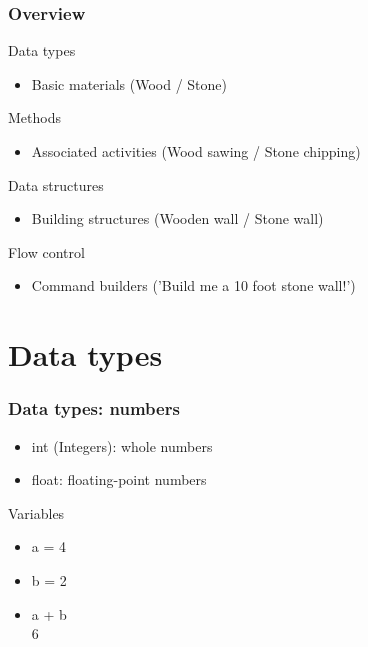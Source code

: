 \documentclass[]{beamer}
\begin{document}
\begin{frame}
\frametitle{Overview}

\begin{block}{Data types}
\begin{itemize}
\item Basic materials (Wood / Stone)  
\end{itemize}
\end{block}

\pause

\begin{block}{Methods}
\begin{itemize}
\item Associated activities (Wood sawing / Stone chipping)
\end{itemize}
\end{block}

\pause

\begin{block}{Data structures}
\begin{itemize}
\item Building structures (Wooden wall / Stone wall)  
\end{itemize}
\end{block}

\pause

\begin{block}{Flow control}
\begin{itemize}
\item Command builders ('Build me a 10 foot stone wall!')
\end{itemize}
\end{block}

\end{frame}


\section{Data types}

\begin{frame}
\frametitle{Data types: numbers}


\begin{itemize}
\item int (Integers): whole numbers 
\item float: floating-point numbers
\end{itemize}

\vspace{1cm}
\pause

\begin{block}{Variables}
\begin{itemize}
\item a = 4
\item b = 2
\item a + b
\\6
\end{itemize}
\end{block}

\end{frame}
\end{document}
